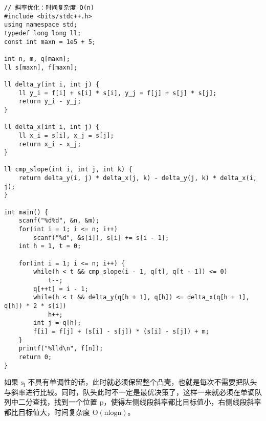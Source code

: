 \documentclass[UTF8]{article}
\begin{document}
\begin{lstlisting}[caption=斜率优化 dp]
// 斜率优化：时间复杂度 O(n)
#include <bits/stdc++.h>
using namespace std;
typedef long long ll;
const int maxn = 1e5 + 5;

int n, m, q[maxn];
ll s[maxn], f[maxn];

ll delta_y(int i, int j) {
    ll y_i = f[i] + s[i] * s[i], y_j = f[j] + s[j] * s[j];
    return y_i - y_j;
}

ll delta_x(int i, int j) {
    ll x_i = s[i], x_j = s[j];
    return x_i - x_j;
}

ll cmp_slope(int i, int j, int k) {
    return delta_y(i, j) * delta_x(j, k) - delta_y(j, k) * delta_x(i, j);
}

int main() {
    scanf("%d%d", &n, &m);
    for(int i = 1; i <= n; i++)
        scanf("%d", &s[i]), s[i] += s[i - 1];
    int h = 1, t = 0;

    for(int i = 1; i <= n; i++) {
        while(h < t && cmp_slope(i - 1, q[t], q[t - 1]) <= 0)
            t--;
        q[++t] = i - 1;
        while(h < t && delta_y(q[h + 1], q[h]) <= delta_x(q[h + 1], q[h]) * 2 * s[i])
            h++;
        int j = q[h];
        f[i] = f[j] + (s[i] - s[j]) * (s[i] - s[j]) + m;
    }
    printf("%lld\n", f[n]);
    return 0;
}
\end{lstlisting}

如果 $\mathrm{s_i}$ 不具有单调性的话，此时就必须保留整个凸壳，也就是每次不需要把队头与斜率进行比较。同时，队头此时不一定是最优决策了，这样一来就必须在单调队列中二分查找，找到一个位置 $\mathrm{p}$，使得左侧线段斜率都比目标值小，右侧线段斜率都比目标值大，时间复杂度 $\mathrm{O(nlogn)}$。
\end{document}
